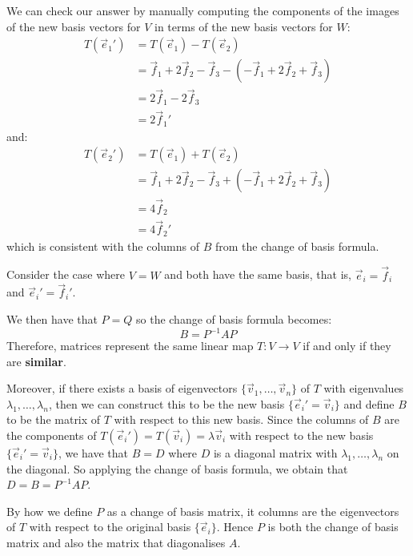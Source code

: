 \documentclass[../main.tex]{subfiles}
\begin{document}
\begin{example}
  We can check our answer by manually computing the components of the images of the new basis vectors for $V$ in terms of the new basis vectors for $W$:
  \begin{align*}
    T(\vec{e}_1') &= T(\vec{e}_1) - T(\vec{e}_2) \\
                  &= \vec{f}_1 + 2\vec{f}_2 - \vec{f}_3 - (-\vec{f}_1 + 2\vec{f}_2 + \vec{f}_3) \\
                  &= 2\vec{f}_1 -2 \vec{f}_3 \\
                  &= 2\vec{f}_1'
  \end{align*}
  and:
  \begin{align*}
    T(\vec{e}_2') &= T(\vec{e}_1) + T(\vec{e}_2) \\
                  &= \vec{f}_1 + 2\vec{f}_2 - \vec{f}_3 + (-\vec{f}_1 + 2\vec{f}_2 + \vec{f}_3) \\
                  &= 4\vec{f}_2 \\
                  &= 4\vec{f}_2'
  \end{align*}
  which is consistent with the columns of $B$ from the change of basis formula.
\end{example}
\begin{remark}
  Consider the case where $V = W$ and both have the same basis, that is, $\vec{e}_i = \vec{f}_i$ and $\vec{e}_i' = \vec{f}_i'$. \label{COBSpecialCases}

  We then have that $P = Q$ so the change of basis formula becomes:
  \[
    B = P^{-1} A P
  \]
  Therefore, matrices represent the same linear map $T: V \to V$ if and only if they are \textbf{similar}.

  Moreover, if there exists a basis of eigenvectors $\{\vec{v}_1, \ldots, \vec{v}_n\}$ of $T$ with eigenvalues $\lambda_1, \ldots, \lambda_n$, then we can construct this to be the new basis $\{\vec{e}_i' = \vec{v}_i\}$ and define $B$ to be the matrix of $T$ with respect to this new basis.
  Since the columns of $B$ are the components of $T(\vec{e}_i')  = T(\vec{v}_i) = \lambda \vec{v}_i$ with respect to the new basis $\{\vec{e}_i' = \vec{v}_i\}$, we have that $B = D$ where $D$ is a diagonal matrix with $\lambda_1, \ldots, \lambda_n$ on the diagonal.
  So applying the change of basis formula, we obtain that $D = B = P^{-1} A P$.

  By how we define $P$ as a change of basis matrix, it columns are the eigenvectors of $T$ with respect to the original basis $\{\vec{e}_i\}$.
  Hence $P$ is both the change of basis matrix and also the matrix that diagonalises $A$.
\end{remark}
\end{document}
